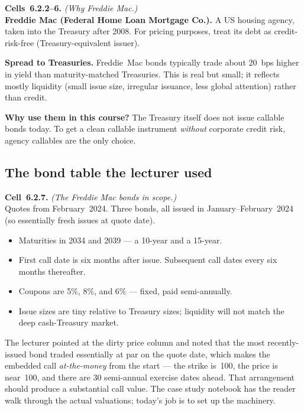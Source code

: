 \begin{keyblock}
\textbf{Cells~6.2.2--6.} \emph{(Why Freddie Mac.)}\\
\textbf{Freddie Mac (Federal Home Loan Mortgage Co.).} A US housing
agency, taken into the Treasury after 2008. For pricing purposes,
treat its debt as credit-risk-free (Treasury-equivalent issuer).

\textbf{Spread to Treasuries.} Freddie~Mac bonds typically trade about
20~bps higher in yield than maturity-matched Treasuries. This is real
but small; it reflects mostly liquidity (small issue size, irregular
issuance, less global attention) rather than credit.

\textbf{Why use them in this course?} The Treasury itself does not
issue callable bonds today. To get a clean callable instrument
\emph{without} corporate credit risk, agency callables are the only
choice.
\end{keyblock}

\subsection{The bond table the lecturer used}\label{L5-sec:freddie-table}

\begin{keyblock}
\textbf{Cell~6.2.7.} \emph{(The Freddie Mac bonds in scope.)}\\
Quotes from February~2024. Three bonds, all issued in
January--February~2024 (so essentially fresh issues at quote date).
\begin{itemize}
  \item Maturities in 2034 and 2039 --- a 10-year and a 15-year.
  \item First call date is six months after issue. Subsequent call
        dates every six months thereafter.
  \item Coupons are 5\%, 8\%, and 6\% --- fixed, paid semi-annually.
  \item Issue sizes are tiny relative to Treasury sizes; liquidity
        will not match the deep cash-Treasury market.
\end{itemize}
\end{keyblock}

The lecturer pointed at the dirty price column and noted that the most
recently-issued bond traded essentially at par on the quote date,
which makes the embedded call \emph{at-the-money} from the start ---
the strike is~100, the price is near~100, and there are 30
semi-annual exercise dates ahead. That arrangement should produce a
substantial call value. The case study notebook has the reader walk
through the actual valuations; today's job is to set up the machinery.

